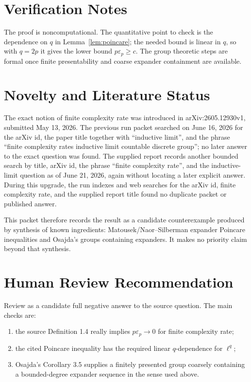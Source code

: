 \documentclass[11pt]{article}
\newcommand{\eps}{\varepsilon}
\begin{document}
\section*{Verification Notes}

The proof is noncomputational.  The quantitative point to check is the
dependence on \(q\) in Lemma~\ref{lem:poincare}; the needed bound is linear in
\(q\), so with \(q=2p\) it gives the lower bound \(p\eps_p\ge c\).  The group
theoretic steps are formal once finite presentability and coarse expander
containment are available.

\section*{Novelty and Literature Status}

The exact notion of finite complexity rate was introduced in arXiv:2605.12930v1,
submitted May 13, 2026.  The previous run packet searched on June 16, 2026 for
the arXiv id, the paper title together with ``inductive limit'', and the phrase
``finite complexity rates inductive limit countable discrete group''; no later
answer to the exact question was found.  The supplied report records another
bounded search by title, arXiv id, the phrase ``finite complexity rate'', and the
inductive-limit question as of June 21, 2026, again without locating a later
explicit answer.  During this upgrade, the run indexes and web searches for the
arXiv id, finite complexity rate, and the supplied report title found no
duplicate packet or published answer.

This packet therefore records the result as a candidate counterexample produced
by synthesis of known ingredients: Matousek/Naor--Silberman expander Poincare
inequalities and Osajda's groups containing expanders.  It makes no priority
claim beyond that synthesis.

\section*{Human Review Recommendation}

Review as a candidate full negative answer to the source question.  The main
checks are:
\begin{enumerate}
  \item the source Definition 1.4 really implies \(p\eps_p\to 0\) for finite
  complexity rate;
  \item the cited Poincare inequality has the required linear \(q\)-dependence
  for \(\ell^q\);
  \item Osajda's Corollary 3.5 supplies a finitely presented group coarsely
  containing a bounded-degree expander sequence in the sense used above.
\end{enumerate}
\end{document}
